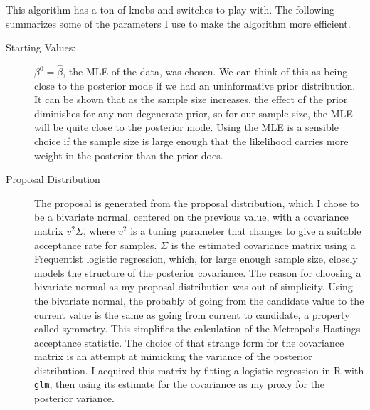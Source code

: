 \documentclass[12pt]{article}
\begin{document}
This algorithm has a ton of knobs and switches to play with. The following summarizes some of the parameters I use to make the algorithm more efficient.
\begin{description}
\item[Starting Values:] $\beta^0 = \hat{\beta}$, the MLE of the data, was chosen. We can think of this as being close to the posterior mode if we had an uninformative prior distribution. It can be shown that as the sample size increases, the effect of the prior diminishes for any non-degenerate prior, so for our sample size, the MLE will be quite close to the posterior mode. Using the MLE is a sensible choice if the sample size is large enough that the likelihood carries more weight in the posterior than the prior does.

\item[Proposal Distribution] The proposal is generated from the proposal distribution, which I chose to be a bivariate normal, centered on the previous value, with a covariance matrix $v^2 \Sigma$, where $v^2$ is a tuning parameter that changes to give a suitable acceptance rate for samples. $\Sigma$ is the estimated covariance matrix using a Frequentist logistic regression, which, for large enough sample size, closely models the structure of the posterior covariance. The reason for choosing a bivariate normal as my proposal distribution was out of simplicity. Using the bivariate normal, the probably of going from the candidate value to the current value is the same as going from current to candidate, a property called symmetry. This simplifies the calculation of the Metropolis-Hastings acceptance statistic. The choice of that strange form for the covariance matrix is an attempt at mimicking the variance of the posterior distribution. I acquired this matrix by fitting a logistic regression in R with \texttt{glm}, then using its estimate for the covariance as my proxy for the posterior variance.


\end{description}
\end{document}
